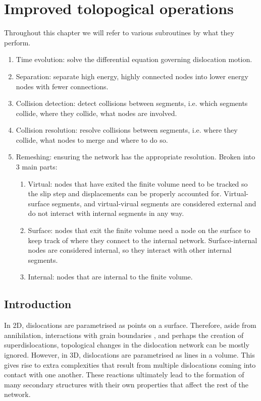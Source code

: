 \chapter{Improved tolopogical operations}
\label{c:topology}

Throughout this chapter we will refer to various subroutines by what they perform.
\begin{enumerate}
    \item Time evolution: solve the differential equation governing dislocation motion.
    \item Separation: separate high energy, highly connected nodes into lower energy nodes with fewer connections.
    \item Collision detection: detect collisions between segments, i.e. which segments collide, where they collide, what nodes are involved.
    \item Collision resolution: resolve collisions between segments, i.e. where they collide, what nodes to merge and where to do so.
    \item Remeshing: ensuring the network has the appropriate resolution. Broken into 3 main parts:
          \begin{enumerate}
              \item Virtual: nodes that have exited the finite volume need to be tracked so the slip step and displacements can be properly accounted for. Virtual-surface segments, and virtual-virual segments are considered external and do not interact with internal segments in any way.
              \item Surface: nodes that exit the finite volume need a node on the surface to keep track of where they connect to the internal network. Surface-internal nodes are considered internal, so they interact with other internal segments.
              \item Internal: nodes that are internal to the finite volume.
          \end{enumerate}
\end{enumerate}

\section{Introduction}

In 2D, dislocations are parametrised as points on a surface. Therefore, aside from annihilation, interactions with grain boundaries \cite{grain_size_eff1, grain_size_eff2}, and perhaps the creation of superdislocations, topological changes in the dislocation network can be mostly ignored. However, in 3D, dislocations are parametrised as lines in a volume. This gives rise to extra complexities that result from multiple dislocations coming into contact with one another. These reactions ultimately lead to the formation of many secondary structures with their own properties that affect the rest of the network.

